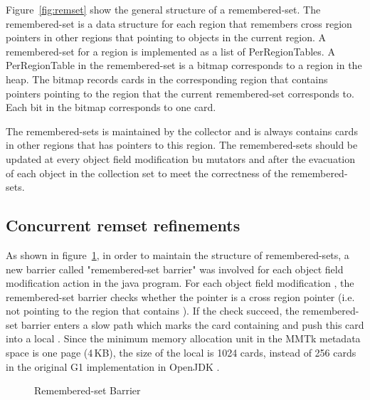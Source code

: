 Figure~\ref{fig:remset} show the general structure of a remembered-set. The remembered-set is a data structure for each region that remembers cross
region pointers in other regions that pointing to objects in the current region.
A remembered-set for a region is implemented as a list of PerRegionTables.
A PerRegionTable in the remembered-set is a bitmap corresponds to a region in the heap.
The bitmap records cards in the corresponding region that contains pointers pointing to the
region that the current remembered-set corresponds to. Each bit in the bitmap corresponds to one card.

\begin{figure*}
  \centering
  \texttt{[image: \{figs/remset.png]}}
  \caption{Remembered-Set Structure}
  \label{fig:remset}
\end{figure*}

The remembered-sets is maintained by the collector and is always contains cards in other regions that has pointers to this region.
The remembered-sets should be updated at every object field modification bu mutators and after
the evacuation of each object in the collection set to meet the correctness of the remembered-sets.

\subsection{Concurrent remset refinements}

As shown in figure~\ref{fig:remsetbarrier}, in order to maintain the structure of remembered-sets,
a new barrier called "remembered-set barrier" was involved for each object field modification action in the java program.
For each object field modification , the remembered-set barrier checks
whether the pointer  is a cross region pointer (i.e. not pointing to the region that contains ).
If the check succeed, the remembered-set barrier enters a slow path which marks the
card containing  and push this card into a local .
Since the minimum memory allocation unit in the MMTk metadata space is one page (4\,KB), the size of
the local  is 1024 cards, instead of 256 cards in the original G1 implementation in OpenJDK \cite{detlefs2004garbage}.

\begin{figure}
  \centering
  
  \caption{Remembered-set Barrier}
  \label{fig:remsetbarrier}
\end{figure}

